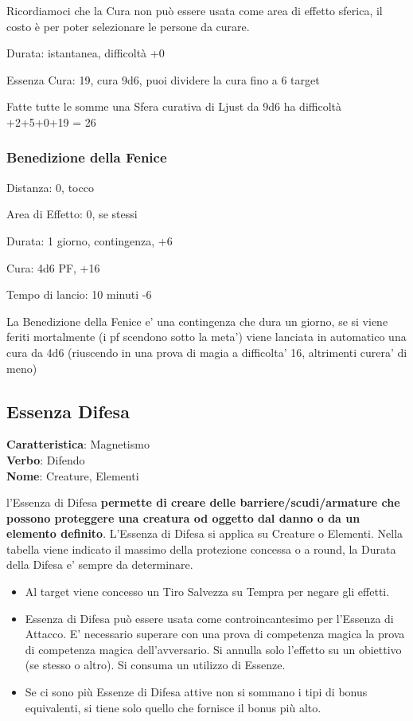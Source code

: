 \documentclass[a4paper,11pt,twoside,openany]{book}
\begin{document}
Ricordiamoci che la Cura non può essere usata come area di effetto sferica, il costo è per poter selezionare le persone da curare.

Durata: istantanea, difficoltà +0

Essenza Cura: 19, cura 9d6, puoi dividere la cura fino a 6 target

Fatte tutte le somme una Sfera curativa di Ljust da 9d6 ha difficoltà +2+5+0+19 = 26

\subsubsection{Benedizione della Fenice}

Distanza: 0, tocco

Area di Effetto: 0, se stessi

Durata: 1 giorno, contingenza, +6

Cura: 4d6 PF, +16

Tempo di lancio: 10 minuti -6 

La Benedizione della Fenice e' una contingenza che dura un giorno, se si viene feriti mortalmente (i pf scendono sotto la meta') viene lanciata in automatico una cura da 4d6 (riuscendo in una prova di magia a difficolta' 16, altrimenti curera' di meno)

\pagebreak

\subsection{Essenza Difesa}

\textbf{Caratteristica}: Magnetismo\\
\textbf{Verbo}: Difendo\\
\textbf{Nome}: Creature, Elementi\\

\label{essenza-difesa---magnetismo}

l'Essenza di Difesa \textbf{permette di creare delle barriere/scudi/armature che possono proteggere una creatura od oggetto dal danno o da un elemento definito}. L'Essenza di Difesa si applica su Creature o Elementi. Nella tabella viene indicato il massimo della protezione concessa o a round, la Durata della Difesa e' sempre da determinare.
\begin{itemize}
	\item
	      Al target viene concesso un Tiro Salvezza su Tempra per negare gli effetti.
	\item
	      Essenza di Difesa può essere usata come controincantesimo per l'Essenza di Attacco. E' necessario superare con una prova di competenza magica la prova di competenza magica dell'avversario. Si annulla solo l'effetto su un obiettivo (se stesso o altro). Si consuma un utilizzo di Essenze.
	\item
	      Se ci sono più Essenze di Difesa attive non si sommano i tipi di bonus equivalenti, si tiene solo quello che fornisce il bonus più alto.
\end{itemize}
\end{document}
